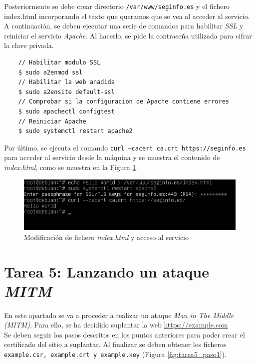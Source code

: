 \documentclass[10pt,a4paper]{article}
\begin{document}
Posteriormente se debe crear directorio \texttt{/var/www/seginfo.es} y el fichero index.html incorporando el texto que queramos que se vea al acceder al servicio.\\
A continuación, se deben ejecutar una serie de comandos para habilitar \textit{SSL} y reiniciar el servicio \emph{Apache}. Al hacerlo, se pide la contraseña utilizada para cifrar la clave privada.\\

\begin{lstlisting}
	// Habilitar modulo SSL
	$ sudo a2enmod ssl
	// Habilitar la web anadida
	$ sudo a2ensite default-ssl
	// Comprobar si la configuracion de Apache contiene errores
	$ sudo apachectl configtest
	// Reiniciar Apache
	$ sudo systemctl restart apache2
\end{lstlisting}

Por último, se ejecuta el comando \texttt{curl --cacert ca.crt https://seginfo.es} para acceder al servicio desde la máquina y se muestra el contenido de \textit{index.html}, como se muestra en la Figura \ref{fig:tarea4_paso3}.\\

\begin{figure}[h!]
	\centering
	\includegraphics[scale=0.6]{images/tarea4_paso3.png}
	\caption{Modificación de fichero \textit{index.html} y acceso al servicio}
	\label{fig:tarea4_paso3}
\end{figure}


\section{Tarea 5: Lanzando un ataque \emph{MITM}}

En este apartado se va a proceder a realizar un ataque \textit{Man in The Middle (MITM)}. Para ello, se ha decidido suplantar la web \url{https://example.com}\\
Se deben seguir los pasos descritos en los puntos anteriores para poder crear el certificado del sitio a suplantar. Al finalizar se deben obtener los ficheros \texttt{example.csr, example.crt y example.key} (Figura \ref{fig:tarea5_paso1}).\\
\end{document}
